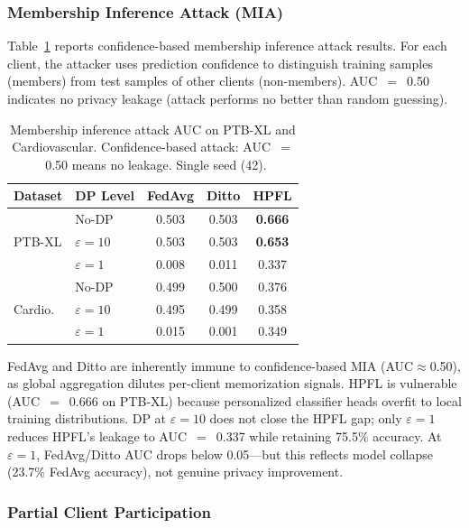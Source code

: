 \documentclass[conference]{IEEEtran}
\begin{document}
\subsubsection{Membership Inference Attack (MIA)}
\label{sec:mia}

Table~\ref{tab:mia_results} reports confidence-based membership inference attack results. For each client, the attacker uses prediction confidence to distinguish training samples (members) from test samples of other clients (non-members). AUC~$=$~0.50 indicates no privacy leakage (attack performs no better than random guessing).

\begin{table}[htbp]
\centering
\caption{Membership inference attack AUC on PTB-XL and Cardiovascular. Confidence-based attack: AUC~$=$~0.50 means no leakage. Single seed (42).}
\label{tab:mia_results}
\small
\begin{tabular}{llccc}
\toprule
\textbf{Dataset} & \textbf{DP Level} & \textbf{FedAvg} & \textbf{Ditto} & \textbf{HPFL} \\
\midrule
\multirow{3}{*}{PTB-XL} & No-DP & 0.503 & 0.503 & \textbf{0.666} \\
 & $\varepsilon{=}10$ & 0.503 & 0.503 & \textbf{0.653} \\
 & $\varepsilon{=}1$ & 0.008 & 0.011 & 0.337 \\
\midrule
\multirow{3}{*}{Cardio.} & No-DP & 0.499 & 0.500 & 0.376 \\
 & $\varepsilon{=}10$ & 0.495 & 0.499 & 0.358 \\
 & $\varepsilon{=}1$ & 0.015 & 0.001 & 0.349 \\
\bottomrule
\end{tabular}

\vspace{1mm}
\footnotesize{FedAvg and Ditto are inherently immune to confidence-based MIA (AUC$\approx$0.50), as global aggregation dilutes per-client memorization signals. HPFL is vulnerable (AUC~$=$~0.666 on PTB-XL) because personalized classifier heads overfit to local training distributions. DP at $\varepsilon{=}10$ does not close the HPFL gap; only $\varepsilon{=}1$ reduces HPFL's leakage to AUC~$=$~0.337 while retaining 75.5\% accuracy. At $\varepsilon{=}1$, FedAvg/Ditto AUC drops below 0.05---but this reflects model collapse (23.7\% FedAvg accuracy), not genuine privacy improvement.}
\end{table}

\subsubsection{Partial Client Participation}
\label{sec:partial_participation}
\end{document}
